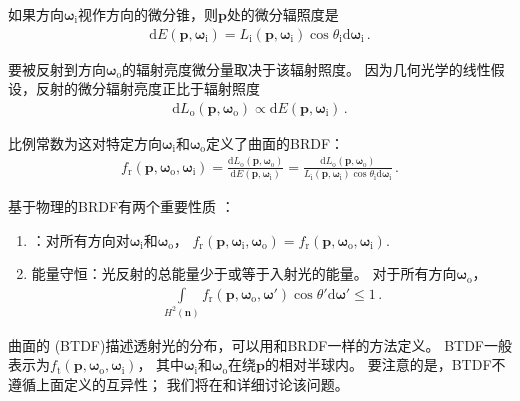 如果方向${\bm\omega}_{\mathrm{i}}$视作方向的微分锥，则$\bm p$处的微分辐照度是
\begin{align}\label{eq:5.7}
    \mathrm{d}E({\bm p},{\bm\omega}_{\mathrm{i}})=L_{\mathrm{i}}({\bm p},{\bm\omega}_{\mathrm{i}})\cos\theta_{\mathrm{i}}\mathrm{d}{\bm\omega}_{\mathrm{i}}\, .
\end{align}

要被反射到方向${\bm\omega}_{\mathrm{o}}$的辐射亮度微分量取决于该辐射照度。
因为几何光学的线性假设，反射的微分辐射亮度正比于辐射照度
\begin{align*}
    \mathrm{d}L_{\mathrm{o}}({\bm p},{\bm\omega}_{\mathrm{o}})\propto\mathrm{d}E({\bm p},{\bm\omega}_{\mathrm{i}})\, .
\end{align*}

比例常数为这对特定方向${\bm\omega}_{\mathrm{i}}$和${\bm\omega}_{\mathrm{o}}$定义了曲面的BRDF：
\begin{align}\label{eq:5.8}
    f_{\mathrm{r}}({\bm p},{\bm \omega}_\mathrm{o},{\bm \omega}_\mathrm{i})=\frac{\mathrm{d}L_{\mathrm{o}}({\bm p},{\bm\omega}_{\mathrm{o}})}{\mathrm{d}E({\bm p},{\bm\omega}_{\mathrm{i}})}=\frac{\mathrm{d}L_{\mathrm{o}}({\bm p},{\bm\omega}_{\mathrm{o}})}{L_{\mathrm{i}}({\bm p},{\bm\omega}_{\mathrm{i}})\cos\theta_{\mathrm{i}}\mathrm{d}{\bm\omega}_{\mathrm{i}}}\, .
\end{align}

基于物理的BRDF有两个重要性质
：
\begin{enumerate}
    \item {}：对所有方向对${\bm\omega}_{\mathrm{i}}$和${\bm\omega}_{\mathrm{o}}$，
          $f_{\mathrm{r}}({\bm p},{\bm \omega}_\mathrm{i},{\bm \omega}_\mathrm{o})=f_{\mathrm{r}}({\bm p},{\bm \omega}_\mathrm{o},{\bm \omega}_\mathrm{i})$.
    \item {\sffamily 能量守恒}：光反射的总能量少于或等于入射光的能量。
          对于所有方向${\bm\omega}_{\mathrm{o}}$，
          \begin{align*}
              \int\limits_{H^2({\bm n})}f_{\mathrm{r}}({\bm p},{\bm \omega}_\mathrm{o},{\bm \omega}')\cos\theta'\mathrm{d}{\bm\omega}'\le1\, .
          \end{align*}
\end{enumerate}

曲面的
(BTDF)描述透射光的分布，可以用和BRDF一样的方法定义。
BTDF一般表示为$f_{\mathrm{t}}({\bm p},{\bm \omega}_\mathrm{o},{\bm \omega}_\mathrm{i})$，
其中${\bm\omega}_{\mathrm{i}}$和${\bm\omega}_{\mathrm{o}}$在绕$\bm p$的相对半球内。
要注意的是，BTDF不遵循上面定义的互异性；
我们将在和详细讨论该问题。

